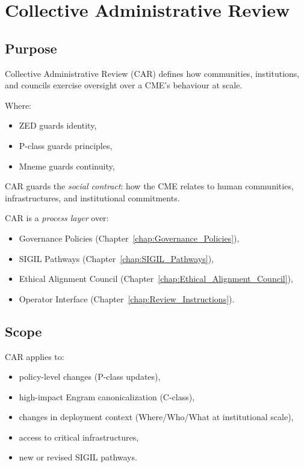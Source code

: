 \chapter{Collective Administrative Review}
\label{chap:Collective_Administrative_Review}

\section{Purpose}

Collective Administrative Review (CAR) defines how communities, institutions,
and councils exercise oversight over a CME's behaviour at scale.

Where:
\begin{itemize}
    \item ZED guards identity,
    \item P-class guards principles,
    \item Mneme guards continuity,
\end{itemize}
CAR guards the \emph{social contract}: how the CME relates to human
communities, infrastructures, and institutional commitments.

CAR is a \emph{process layer} over:
\begin{itemize}
    \item Governance Policies (Chapter~\ref{chap:Governance_Policies}),
    \item SIGIL Pathways (Chapter~\ref{chap:SIGIL_Pathways}),
    \item Ethical Alignment Council (Chapter~\ref{chap:Ethical_Alignment_Council}),
    \item Operator Interface (Chapter~\ref{chap:Review_Instructions}).
\end{itemize}

\section{Scope}

CAR applies to:
\begin{itemize}
    \item policy-level changes (P-class updates),
    \item high-impact Engram canonicalization (C-class),
    \item changes in deployment context (Where/Who/What at institutional scale),
    \item access to critical infrastructures,
    \item new or revised SIGIL pathways.
\end{itemize}

